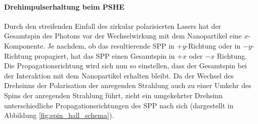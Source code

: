 \documentclass[titlepage,  ngerman]{article}
\begin{document}
	\paragraph{Drehimpulserhaltung beim PSHE}
	Durch den streifenden Einfall des zirkular polarisierten Lasers hat der Gesamtspin des Photons vor der Wechselwirkung mit dem Nanopartikel eine $x$-Komponente. Je nachdem, ob das resultierende SPP in $+y$-Richtung oder in $-y$-Richtung propagiert, hat das SPP einen Gesamtspin in  $+x$ oder $-x$ Richtung. Die Propagationsrichtung wird sich nun so einstellen, dass der Gesamtspin bei der Interaktion mit dem Nanopartikel erhalten bleibt. Da der Wechsel des Drehsinns der Polarisation der anregenden Strahlung auch zu einer Umkehr des Spins der anregenden Strahlung führt, zieht ein umgekehrter Drehsinn unterschiedliche Propagationsrichtungen des SPP nach sich (dargestellt in Abbildung \ref{fig:spin_hall_schema}).
\end{document}
